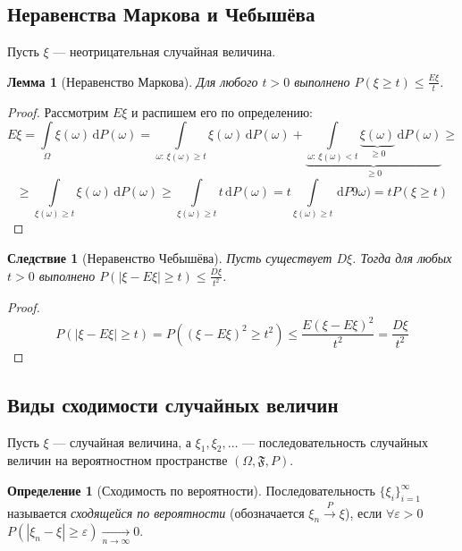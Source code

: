 \documentclass[11pt,openany,a4paper]{scrartcl}
\theoremstyle{plain}
\newtheorem{corollary}[theorem]{Следствие}
\newtheorem{lemma}[theorem]{Лемма}
\theoremstyle{definition}
\newtheorem{definition}[theorem]{Определение}
\newcommand{\underto}[1]{\xrightarrow[#1]{}}
\newcommand{\overto}[1]{\xrightarrow{#1}}
\newcommand{\dif}{\, \mathrm d}
\begin{document}
\subsection{Неравенства Маркова и Чебышёва}

Пусть $\xi$ — неотрицательная случайная величина.
\begin{lemma}[Неравенство Маркова]
    Для любого $t > 0$ выполнено $P(\xi \geqslant t) \leqslant \frac{E\xi}{t}$.
\end{lemma}
\begin{proof}
    Рассмотрим $E\xi$ и распишем его по определению:
    $$
    E\xi = \int\limits_\Omega \xi(\omega) \dif P(\omega) =
    \int\limits_{\omega:\, \xi(\omega)\geqslant t} \xi(\omega)\dif P(\omega) +
    \underbrace{\int\limits_{\omega:\, \xi(\omega) < t}
    \underbrace{\xi(\omega)}_{\geqslant 0} \dif P(\omega)}_{\geqslant 0} \geqslant
    $$
    $$
    \geqslant \int\limits_{\xi(\omega) \geqslant t} \xi(\omega)\dif P(\omega)
    \geqslant \int\limits_{\xi(\omega) \geqslant t} t\dif P(\omega) =
    t\int\limits_{\xi(\omega) \geqslant t} \dif P9\omega) =
    tP(\xi \geqslant t)
    $$
\end{proof}
\begin{corollary}[Неравенство Чебышёва]
    Пусть существует $D\xi$. Тогда для любых $t > 0$ выполнено
    $P(|\xi - E\xi| \geqslant t) \leqslant \frac{D\xi}{t^2}$.
\end{corollary}
\begin{proof}
    $$
    P(|\xi - E\xi| \geqslant t) = P((\xi - E\xi)^2 \geqslant t^2) \leqslant
    \frac{E(\xi - E\xi)^2}{t^2} = \frac{D\xi}{t^2}
    $$
\end{proof}

\subsection{Виды сходимости случайных величин}

Пусть $\xi$ — случайная величина, а
$\xi_1, \xi_2, \ldots$ — последовательность случайных величин на 
вероятностном пространстве $(\Omega, \mathfrak F, P)$.

\begin{definition}[Сходимость по вероятности]\label{probability_convergence}
    Последовательность $\{\xi_i\}_{i = 1}^\infty$ называется 
    \emph{сходящейся по вероятности} (обозначается $\xi_n \overto{P} \xi$), если
    $\forall \varepsilon > 0$ $P(|\xi_n - \xi| \geqslant \varepsilon)
    \underto{n \to \infty} 0$.    
\end{definition}
\end{document}

